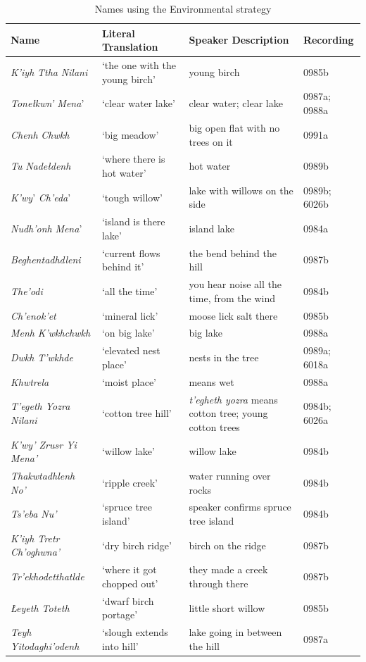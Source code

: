 \begin{table}[!h]
\caption{Names using the Environmental strategy}\label{holton:tab:environmental}
\begin{tabular}{L{3.5cm} | L{3cm} | L{3cm} | l} 
\small
{\bfseries Name} &
{\bfseries Literal Translation} &
{\bfseries Speaker Description} &
{\bfseries Recording}\\\hline

 \textit{K’iyh} \textit{Ttha} \textit{Nilani} &
‘the one with the young birch’ &
young birch &
0985b \\
 \textit{Tonełkwn’ Mena}’ &
‘clear water lake’ &
clear water; clear lake &
0987a; 0988a \\
 \textit{Chenh} \textit{Chwkh} &
‘big meadow’ &
big open flat with no trees on it &
0991a\\
\textit{Tu} \textit{Nadełdenh} &
‘where there is hot water’ &
hot water &
0989b \\
\textit{K’wy}’ \textit{Ch’eda}’ &
‘tough willow’ &
lake with willows on the side &
0989b; 6026b\\
 \textit{Nudh’onh} \textit{Mena}’ &
‘island is there lake’ &
island lake &
0984a\\
\textit{Beghentadhdleni} &
‘current flows behind  it’ &
the bend behind the hill &
0987b \\
\textit{The’odi} &
‘all the time’ &
you hear noise all the time, from the wind &
0984b

\\
\textit{Ch’enok’et} &
‘mineral lick’ &
moose lick salt there &
0985b \\
 \textit{Menh} \textit{K’wkhchwkh} &
‘on big lake’ &
big lake &
0988a \\
\textit{Dwkh} \textit{T’wkhde} &
‘elevated nest place’ &
nests in the tree &
0989a; 6018a\\
\textit{Khwtrela} &
‘moist place’ &
means wet &
0988a \\
\textit{T’egeth Yozra Nilani} &
‘cotton tree hill’ &
\textit{t’egheth yozra} means cotton tree; young cotton trees &
0984b; 6026a\\
\textit{K’wy’ Zrusr Yi Mena’} &
‘willow lake’ &
willow lake &
0984b\\
\textit{Thakwtadhlenh No’} &
‘ripple creek’ &
water running over rocks &
0984b \\
\textit{Ts’eba Nu’} &
‘spruce tree island’ &
speaker confirms spruce tree island &
0984b\\
\textit{K’iyh Tretr Ch’oghwna’} &
‘dry birch ridge’ &
birch on the ridge &
0987b\\
 \textit{Tr’ekhodetthatlde}  &
‘where it got chopped out’ &
they made a creek through there &
0987b\\
\textit{Łeyeth Toteth} &
‘dwarf birch portage’ &
little short willow &
0985b\\
\textit{Teyh Yitodaghi’odenh} &
‘slough extends into hill’ &
lake going in between the hill &
0987a\\
\end{tabular}
\end{table}

